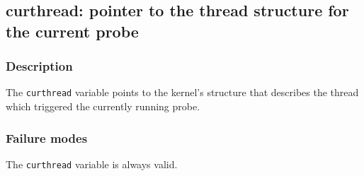 \clearpage
{}
{}
\label{vars:curthread}
\subsection*{curthread: pointer to the thread structure for the
  current probe}

\subsubsection*{Description}

The \verb|curthread| variable points to the kernel's structure that
describes the thread which triggered the currently running probe.

\subsubsection*{Failure modes}

The \verb|curthread| variable is always valid.
